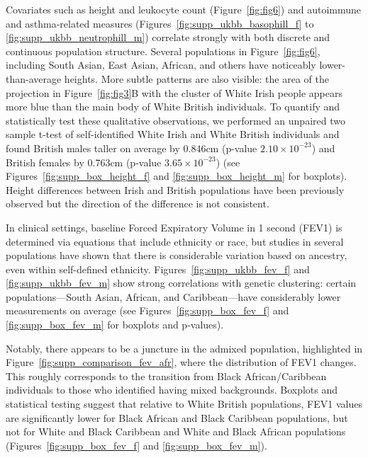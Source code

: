 Covariates such as height and leukocyte count (Figure~\ref{fig:fig6}) and autoimmune and asthma-related measures (Figures~\ref{fig:supp_ukbb_basophill_f} to \ref{fig:supp_ukbb_neutrophill_m}) correlate strongly with both discrete and continuous population structure. Several populations in Figure~\ref{fig:fig6}, including South Asian, East Asian, African, and others have noticeably lower-than-average heights. More subtle patterns are also visible: the area of the projection in Figure~\ref{fig:fig3}B with the cluster of White Irish people appears more blue than the main body of White British individuals. To quantify and statistically test these qualitative observations, we performed an unpaired two sample t-test of self-identified White Irish and White British individuals and found British males taller on average by 0.846cm (p-value $2.10\times 10^{-23}$) and British females by 0.763cm (p-value $3.65\times 10^{-23}$) (see Figures~\ref{fig:supp_box_height_f} and \ref{fig:supp_box_height_m} for boxplots). Height differences between Irish and British populations have been previously observed but the direction of the difference is not consistent\citep{robinson2015population,komlos1994stature}.

In clinical settings, baseline Forced Expiratory Volume in 1 second (FEV1) is determined via equations that include ethnicity or race\citep{quanjer2012multi}, but studies in several populations have shown that there is considerable variation based on ancestry, even within self-defined ethnicity\citep{ortega2015effect}. Figures~\ref{fig:supp_ukbb_fev_f} and \ref{fig:supp_ukbb_fev_m} show strong correlations with genetic clustering: certain populations---South Asian, African, and Caribbean---have considerably lower measurements on average (see Figures~\ref{fig:supp_box_fev_f} and \ref{fig:supp_box_fev_m} for boxplots and p-values). 
 
Notably, there appears to be a juncture in the admixed population, highlighted in Figure~\ref{fig:supp_comparison_fev_afr}, where the distribution of FEV1 changes. This roughly corresponds to the transition from Black African/Caribbean individuals to those who identified having mixed backgrounds. Boxplots and statistical testing suggest that relative to White British populations, FEV1 values are significantly lower for Black African and Black Caribbean populations, but not for White and Black Caribbean and White and Black African populations (Figures~\ref{fig:supp_box_fev_f} and \ref{fig:supp_box_fev_m}).

